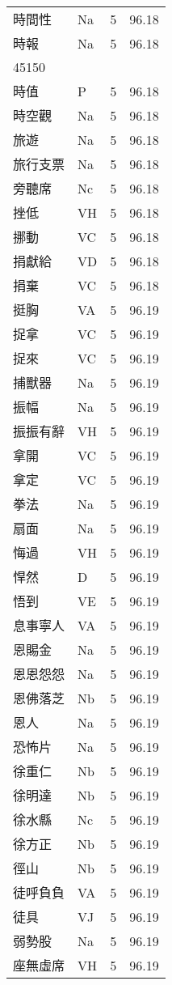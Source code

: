 \documentclass[twocolumn]{book}
\begin{document}
\begin{supertabular}{llrr}
時間性 & Na & 5 &  96.18\\
時報 & Na & 5 &  96.18\\
45150\\
時值 & P & 5 &  96.18\\
時空觀 & Na & 5 &  96.18\\
旅遊 & Na & 5 &  96.18\\
旅行支票 & Na & 5 &  96.18\\
旁聽席 & Nc & 5 &  96.18\\
挫低 & VH & 5 &  96.18\\
挪動 & VC & 5 &  96.18\\
捐獻給 & VD & 5 &  96.18\\
捐棄 & VC & 5 &  96.18\\
挺胸 & VA & 5 &  96.19\\
捉拿 & VC & 5 &  96.19\\
捉來 & VC & 5 &  96.19\\
捕獸器 & Na & 5 &  96.19\\
振幅 & Na & 5 &  96.19\\
振振有辭 & VH & 5 &  96.19\\
拿開 & VC & 5 &  96.19\\
拿定 & VC & 5 &  96.19\\
拳法 & Na & 5 &  96.19\\
扇面 & Na & 5 &  96.19\\
悔過 & VH & 5 &  96.19\\
悍然 & D & 5 &  96.19\\
悟到 & VE & 5 &  96.19\\
息事寧人 & VA & 5 &  96.19\\
恩賜金 & Na & 5 &  96.19\\
恩恩怨怨 & Na & 5 &  96.19\\
恩佛落芝 & Nb & 5 &  96.19\\
恩人 & Na & 5 &  96.19\\
恐怖片 & Na & 5 &  96.19\\
徐重仁 & Nb & 5 &  96.19\\
徐明達 & Nb & 5 &  96.19\\
徐水縣 & Nc & 5 &  96.19\\
徐方正 & Nb & 5 &  96.19\\
徑山 & Nb & 5 &  96.19\\
徒呼負負 & VA & 5 &  96.19\\
徒具 & VJ & 5 &  96.19\\
弱勢股 & Na & 5 &  96.19\\
座無虛席 & VH & 5 &  96.19\\

\end{supertabular}
\end{document}
